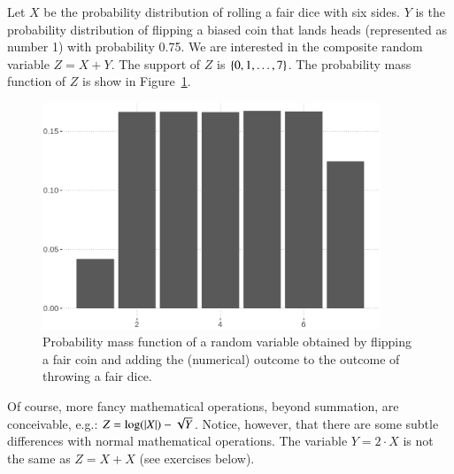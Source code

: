 \documentclass[nobib,nofonts]{tufte-handout}
\newcommand{\mult}{\ensuremath{\cdot}}
\begin{document}
\begin{example}
  Let $X$ be the probability distribution of rolling a fair dice with six sides.
  $Y$ is the probability distribution of flipping a biased coin that lands heads (represented as number 1) with probability 0.75.
  We are interested in the composite random variable $Z = X + Y$.
  The support of $Z$ is $\left\{0, 1, \dots, 7\right\}$.
  The probability mass function of $Z$ is show in Figure~\ref{fig:composite-RV}.
  \begin{figure}
    \centering
    \includegraphics[width=0.9\textwidth]{00-pics/05-04-mass-composite-RV.png}
    \caption{Probability mass function of a random variable obtained by flipping a fair coin and adding the (numerical) outcome to the outcome of throwing a fair dice.}
    \label{fig:composite-RV}
  \end{figure}
\end{example}

Of course, more fancy mathematical operations, beyond summation, are conceivable, e.g.: $Z = \log(\lvert X \rvert) - \sqrt{Y}$.
Notice, however, that there are some subtle differences with normal mathematical operations.
The variable $Y = 2 \mult X$ is not the same as $Z = X + X$ (see exercises below).
\end{document}
